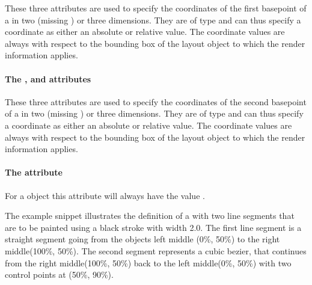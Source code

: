 These three attributes are used to specify the coordinates of the first basepoint of a \RenderCubicBezier in two (missing ) or three dimensions. They are of type \RelAbsVector and can thus specify a coordinate as either an absolute or relative value. The coordinate
values are always with respect to the bounding box of the layout object to which the
render information applies.


\paragraph{The \fixttspace{}, \fixttspace{} and \fixttspace{} attributes}

These three attributes are used to specify the coordinates of the second basepoint of a \RenderCubicBezier in two (missing ) or three dimensions. They are of type \RelAbsVector and can thus specify a coordinate as either an absolute or relative value. The coordinate
values are always with respect to the bounding box of the layout object to which the
render information applies.

\paragraph{The \fixttspace{} attribute}

For a \RenderCubicBezier object this attribute will always have the value .



The example snippet illustrates the definition of a \RenderCurve with two line segments 
that are to be painted using a black stroke with width 2.0.
The first line segment is a straight segment going from the objects left middle (0\%, 50\%) 
to the right middle(100\%, 50\%). The second segment represents a cubic bezier, that 
continues from the right middle(100\%, 50\%) back to the left middle(0\%, 50\%) with 
two control points at (50\%, 90\%).


{\footnotesize
{}
} 

